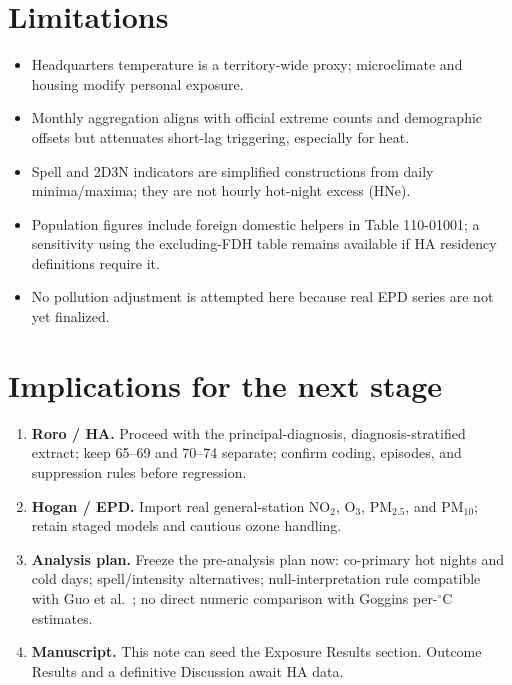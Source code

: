 \documentclass[11pt]{article}
\begin{document}
\section{Limitations}

\begin{itemize}
  \item Headquarters temperature is a territory-wide proxy; microclimate and housing modify
        personal exposure.
  \item Monthly aggregation aligns with official extreme counts and demographic offsets but
        attenuates short-lag triggering, especially for heat.
  \item Spell and 2D3N indicators are simplified constructions from daily minima/maxima;
        they are not hourly hot-night excess (HNe).
  \item Population figures include foreign domestic helpers in Table 110-01001; a
        sensitivity using the excluding-FDH table remains available if HA residency
        definitions require it.
  \item No pollution adjustment is attempted here because real EPD series are not yet
        finalized.
\end{itemize}

\section{Implications for the next stage}

\begin{enumerate}
  \item \textbf{Roro / HA.} Proceed with the principal-diagnosis, diagnosis-stratified
        extract; keep 65--69 and 70--74 separate; confirm coding, episodes, and suppression
        rules before regression.
  \item \textbf{Hogan / EPD.} Import real general-station NO$_2$, O$_3$, PM$_{2.5}$, and
        PM$_{10}$; retain staged models and cautious ozone handling.
  \item \textbf{Analysis plan.} Freeze the pre-analysis plan now: co-primary hot nights and
        cold days; spell/intensity alternatives; null-interpretation rule compatible with
        Guo et al.\ \citep{guo2024}; no direct numeric comparison with Goggins per-$^\circ$C
        estimates.
  \item \textbf{Manuscript.} This note can seed the Exposure Results section. Outcome
        Results and a definitive Discussion await HA data.
\end{enumerate}
\end{document}
